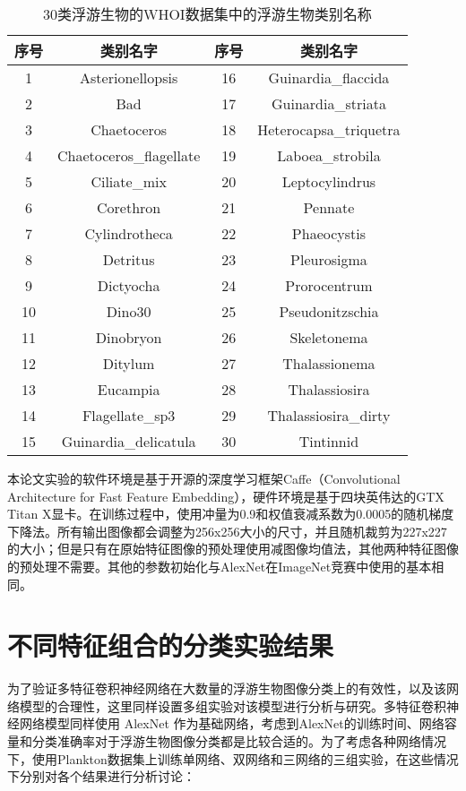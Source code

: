 \begin{table}[H]\normalsize
\centering
\caption{30类浮游生物的WHOI数据集中的浮游生物类别名称}
\label{table:name}
\begin{tabular}{|c|c|c|c|}
\hline
序号 & 类别名字 & 序号 & 类别名字 \\
\hline
1 & Asterionellopsis & 16 & Guinardia\_flaccida \\ 
\hline
2 & Bad & 17 & Guinardia\_striata \\ 
\hline
3 & Chaetoceros & 18 & Heterocapsa\_triquetra \\
\hline
4 & Chaetoceros\_flagellate & 19 & Laboea\_strobila \\
\hline
5 & Ciliate\_mix & 20 & Leptocylindrus \\
\hline
6 & Corethron & 21 & Pennate \\
\hline
7 & Cylindrotheca & 22 & Phaeocystis \\
\hline
8 & Detritus & 23 & Pleurosigma \\
\hline
9 & Dictyocha & 24 & Prorocentrum \\
\hline
10 & Dino30 & 25 & Pseudonitzschia \\
\hline
11 & Dinobryon & 26 & Skeletonema \\
\hline
12 & Ditylum & 27 & Thalassionema \\
\hline
13 & Eucampia & 28 & Thalassiosira \\
\hline
14 & Flagellate\_sp3 & 29 & Thalassiosira\_dirty\\
\hline
15 & Guinardia\_delicatula & 30 & Tintinnid \\
\hline
\end{tabular}
\end{table}

本论文实验的软件环境是基于开源的深度学习框架Caffe（Convolutional Architecture for Fast Feature Embedding），硬件环境是基于四块英伟达的GTX Titan X显卡。在训练过程中，使用冲量为0.9和权值衰减系数为0.0005的随机梯度下降法。所有输出图像都会调整为256x256大小的尺寸，并且随机裁剪为227x227的大小；但是只有在原始特征图像的预处理使用减图像均值法，其他两种特征图像的预处理不需要。其他的参数初始化与AlexNet在ImageNet竞赛中使用的基本相同。

\section{不同特征组合的分类实验结果}

为了验证多特征卷积神经网络在大数量的浮游生物图像分类上的有效性，以及该网络模型的合理性，这里同样设置多组实验对该模型进行分析与研究。多特征卷积神经网络模型同样使用 AlexNet 作为基础网络，考虑到AlexNet的训练时间、网络容量和分类准确率对于浮游生物图像分类都是比较合适的。为了考虑各种网络情况下，使用Plankton数据集上训练单网络、双网络和三网络的三组实验，在这些情况下分别对各个结果进行分析讨论：

